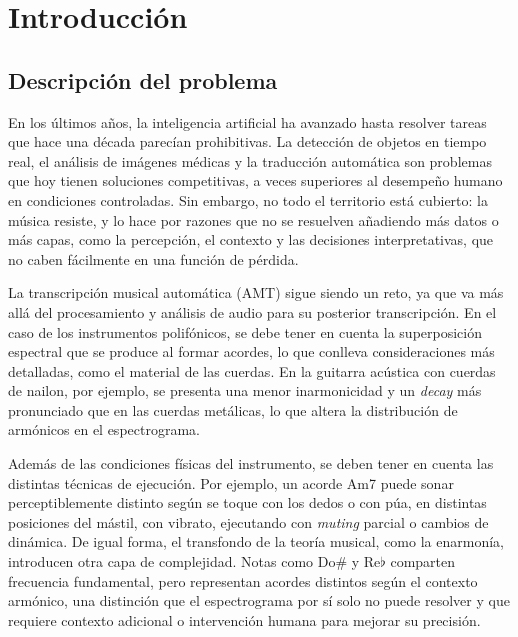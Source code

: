 \section{Introducción}
\subsection{Descripción del problema}

En los últimos años, la inteligencia artificial ha avanzado hasta resolver tareas que hace una década parecían prohibitivas. La detección de objetos en tiempo real, el análisis de imágenes médicas y la traducción automática son problemas que hoy tienen soluciones competitivas, a veces superiores al desempeño humano en condiciones controladas. Sin embargo, no todo el territorio está cubierto: la música resiste, y lo hace por razones que no se resuelven añadiendo más datos o más capas, como la percepción, el contexto y las decisiones interpretativas, que no caben fácilmente en una función de pérdida.

La transcripción musical automática (AMT) sigue siendo un reto, ya que va más allá del procesamiento y análisis de audio para su posterior transcripción. En el caso de los instrumentos polifónicos, se debe tener en cuenta la superposición espectral que se produce al formar acordes, lo que conlleva consideraciones más detalladas, como el material de las cuerdas. En la guitarra acústica con cuerdas de nailon, por ejemplo, se presenta una menor inarmonicidad y un \textit{decay} más pronunciado que en las cuerdas metálicas, lo que altera la distribución de armónicos en el espectrograma.

Además de las condiciones físicas del instrumento, se deben tener en cuenta las distintas técnicas de ejecución. Por ejemplo, un acorde Am7 puede sonar perceptiblemente distinto según se toque con los dedos o con púa, en distintas posiciones del mástil, con vibrato, ejecutando con \textit{muting} parcial o cambios de dinámica. De igual forma, el transfondo de la teoría musical, como la enarmonía, introducen otra capa de complejidad. Notas como Do\# y Re$\flat$ comparten frecuencia fundamental, pero representan acordes distintos según el contexto armónico, una distinción que el espectrograma por sí solo no puede resolver y que requiere contexto adicional o intervención humana para mejorar su precisión.
